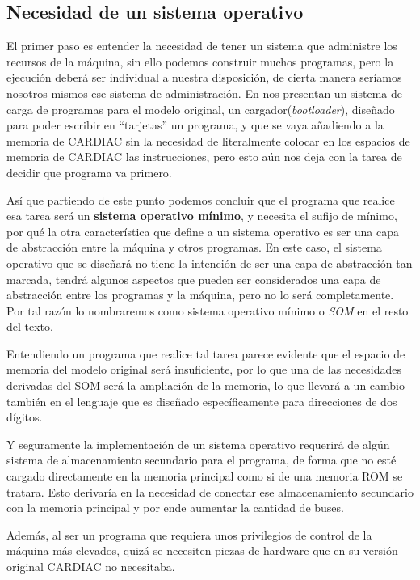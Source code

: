 \documentclass[letterpaper,12pt,oneside]{book}
\begin{document}
	
	
		\subsection{Necesidad de un sistema operativo}
		
		El primer paso es entender la necesidad de tener un sistema que administre los recursos de la máquina, sin ello podemos construir muchos programas, pero
		la ejecución deberá ser individual a nuestra disposición, de cierta manera seríamos nosotros mismos ese sistema de administración. En 
		\cite[p. 42]{fingerman_instruction_1968}
		nos presentan un sistema de carga de programas para el modelo original, un cargador(\textit{bootloader}), diseñado para poder escribir en ``tarjetas'' un programa, y que se vaya
		añadiendo a la memoria de CARDIAC sin la necesidad de literalmente colocar en los espacios de memoria de CARDIAC las instrucciones, pero esto aún nos deja
		con la tarea de decidir que programa va primero.
  
        Así que partiendo de este punto podemos concluir que el programa que realice esa tarea será un\textbf{ sistema
		operativo mínimo}, y necesita el sufijo de mínimo, por qué la otra característica que define
		a un sistema operativo es ser una capa de abstracción entre la máquina y otros programas. En este
		caso, el sistema operativo que se diseñará no tiene la intención de ser una capa de abstracción tan marcada, tendrá algunos aspectos que pueden ser considerados
		una capa de abstracción entre los programas y la máquina, pero no lo será completamente. Por tal razón lo nombraremos como sistema operativo mínimo o \textit{SOM} en el resto del texto.
		
		Entendiendo un programa que realice tal tarea parece evidente que el espacio de memoria del modelo original será insuficiente, por lo que una de las necesidades
		derivadas del SOM será la ampliación de la memoria, lo que llevará a un cambio también en el lenguaje que es diseñado específicamente para direcciones de dos 
		dígitos.
  
        Y seguramente la implementación de un sistema operativo requerirá de algún sistema de almacenamiento secundario para el programa, de forma que no esté
		cargado directamente en la memoria principal como si de una memoria ROM se tratara. Esto derivaría en la necesidad de conectar ese almacenamiento secundario
		con la memoria principal y por ende aumentar la cantidad de buses.
  
        Además, al ser un programa que requiera unos privilegios de control de la máquina más elevados,
		quizá se necesiten piezas de hardware que en su versión original CARDIAC no necesitaba.
		
\end{document}
